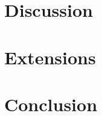 \documentclass[a4paper]{article}
\begin{document}
	\section{Discussion}
	\section{Extensions}
	\section{Conclusion}
	\newpage
	{}
	
\end{document}
